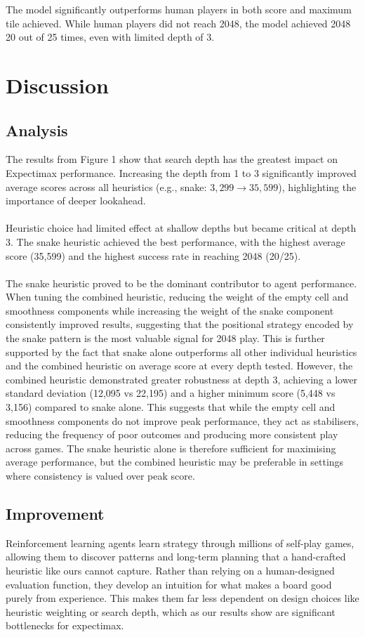 \documentclass{article}
\begin{document}
The model significantly outperforms human players in both score and maximum tile achieved.
While human players did not reach 2048, the model achieved 2048 20 out of 25 times, even with limited depth of 3.

\section{Discussion}

\subsection*{Analysis}

The results from Figure 1 show that search depth has the greatest impact on Expectimax performance.
Increasing the depth from 1 to 3 significantly improved average scores across all heuristics
(e.g., snake: $3,299 \rightarrow 35,599$), highlighting the importance of deeper lookahead.
\\
\\
Heuristic choice had limited effect at shallow depths but became critical at depth 3.
The snake heuristic achieved the best performance, with the highest average score (35,599) and the highest success 
rate in reaching 2048 (20/25).
\\
\\
The snake heuristic proved to be the dominant contributor to agent performance. When tuning the combined heuristic,
reducing the weight of the empty cell and smoothness components while increasing the weight of the snake component
consistently improved results, suggesting that the positional strategy encoded by the snake pattern is the most
valuable signal for 2048 play. This is further supported by the fact that snake alone outperforms all other individual
heuristics and the combined heuristic on average score at every depth tested. However, the combined heuristic
demonstrated greater robustness at depth 3, achieving a lower standard deviation (12,095 vs 22,195) and a higher
minimum score (5,448 vs 3,156) compared to snake alone. This suggests that while the empty cell and smoothness
components do not improve peak performance, they act as stabilisers, reducing the frequency of poor outcomes and
producing more consistent play across games. The snake heuristic alone is therefore sufficient for maximising average
performance, but the combined heuristic may be preferable in settings where consistency is valued over peak score.

\subsection*{Improvement}

Reinforcement learning agents learn strategy through millions of self-play games, allowing them to discover
patterns and long-term planning that a hand-crafted heuristic like ours cannot capture. Rather than relying on
a human-designed evaluation function, they develop an intuition for what makes a board good purely from experience.
This makes them far less dependent on design choices like heuristic weighting or search depth, which as our results
show are significant bottlenecks for expectimax. 
\end{document}
